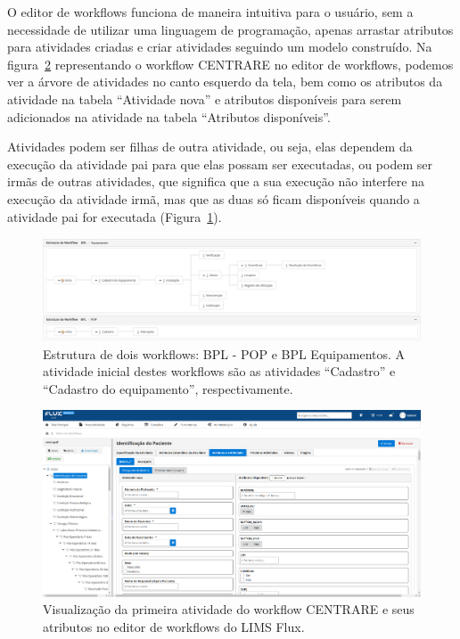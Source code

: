 O editor de workflows funciona de maneira intuitiva para o usuário, sem a necessidade de utilizar uma linguagem de programação, apenas arrastar atributos para atividades criadas e criar atividades seguindo um modelo construído. Na figura~\ref{fig:editor_centrare} representando o workflow CENTRARE no editor de workflows, podemos ver a árvore de atividades no canto esquerdo da tela, bem como os atributos da atividade na tabela ``Atividade nova'' e atributos disponíveis para serem adicionados na atividade na tabela ``Atributos disponíveis''.

Atividades podem ser filhas de outra atividade, ou seja, elas dependem da execução da atividade pai para que elas possam ser executadas, ou podem ser irmãs de outras atividades, que significa que a sua execução não interfere na execução da atividade irmã, mas que as duas só ficam disponíveis quando a atividade pai for executada (Figura~\ref{fig:estrutura_workflow}).

\begin{figure}
    \centering
    \includegraphics[width=1\textwidth]{imgs/BPL/estrutura.png}
    \caption{Estrutura de dois workflows: BPL - POP e BPL Equipamentos. A atividade inicial destes workflows são as atividades ``Cadastro'' e ``Cadastro do equipamento'', respectivamente.}
    \label{fig:estrutura_workflow}
\end{figure}

\begin{figure}
    \centering
    \includegraphics[width=1\textwidth]{imgs/Flux/Workflows/Editor/editor_centrare.png}
    \caption{Visualização da primeira atividade do workflow CENTRARE e seus atributos no editor de workflows do LIMS Flux.}
    \label{fig:editor_centrare}
\end{figure}

